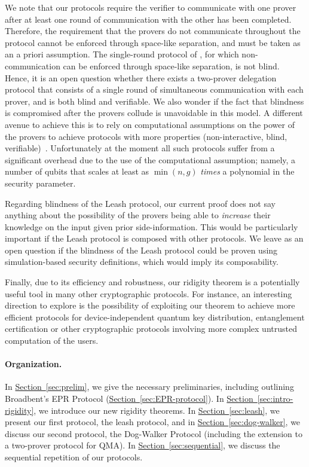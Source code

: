 \documentclass[11pt]{article}
\numberwithin{equation}{section}
\theoremstyle{definition}
\theoremstyle{plain}
\newcommand{\expref}[2]{\hyperref[#2]{#1~\ref{#2}}}
\begin{document}
We note that our protocols require the verifier to communicate with one
prover after at least one round of communication with the other has been
completed. Therefore, the requirement that the provers do not
communicate throughout the protocol cannot be enforced through space-like
separation, and must be taken as an a priori assumption.
The single-round protocol of \cite{Grilo17}, for which non-communication can be enforced through space-like separation, is not blind. Hence, it is an open question
whether there exists a two-prover
delegation protocol that consists of a single round of simultaneous
communication with each prover, and is both blind and verifiable. 
We also wonder if the fact that blindness is compromised after the provers
collude is unavoidable in this model.
A different
avenue to achieve this is to rely on computational assumptions on the power of
the provers to achieve protocols with more properties (non-interactive, blind,
verifiable)~\cite{dulek16,alagic2017quantum,mahadev2017,mahadev2018}. Unfortunately at the moment all such protocols suffer from a significant overhead due to the use of the computational assumption; namely, a number of qubits that scales at least as $\min(n,g)$ \emph{times} a polynomial in the security parameter. 

Regarding blindness of the Leash protocol, our current proof does not say anything about the possibility of the provers being able to \emph{increase} their knowledge on the input given prior side-information. This would be particularly important if the Leash protocol is composed with other protocols. We leave as an open question if the blindness of the Leash protocol could be proven using simulation-based security definitions, which would imply its composability.


Finally, due to its efficiency and robustness, our ridigity theorem is a
potentially useful tool in many other cryptographic protocols. For instance, an
interesting direction to explore is the possibility of exploiting our theorem to
achieve more efficient protocols for device-independent quantum key
distribution, entanglement certification or other cryptographic protocols
involving more complex untrusted computation of the users.




\paragraph{Organization.}
In \expref{Section}{sec:prelim}, we give the necessary preliminaries, including
outlining Broadbent's EPR Protocol (\expref{Section}{sec:EPR-protocol}). In
\expref{Section}{sec:intro-rigidity}, we introduce our new rigidity theorems. In
\expref{Section}{sec:leash}, we present our first protocol, the leash protocol, and in
\expref{Section}{sec:dog-walker}, we discuss our second protocol, the
Dog-Walker Protocol (including the extension to a two-prover protocol for QMA). In \expref{Section}{sec:sequential}, we discuss the sequential repetition of our protocols.
\end{document}

